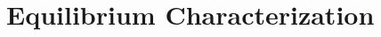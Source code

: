 \documentclass[sigconf,review]{acmart}
\begin{document}



\section{Equilibrium Characterization}
\label{supp:equilibrium}
\end{document}
